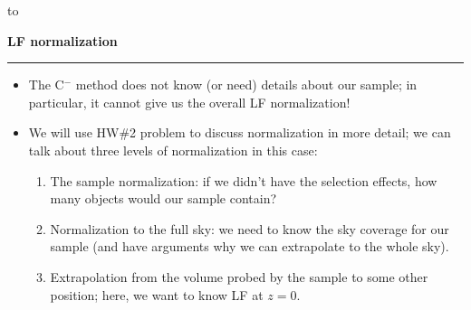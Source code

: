 \documentclass[letterpaper,landscape]{slides}
\begin{document}
\begin{slide}

\hbox to 
\vfill 
\end{slide}




\begin{slide}
\begin{center}
\bfseries
{\large {\color{red} LF normalization}}
\end{center}
\vskip 0.2in
\hrule

\begin{itemize}
\item The C$^-$ method does not know (or need) details about our sample; in particular, 
     it cannot give us the overall LF normalization! 
\item We will use HW\#2 problem to discuss normalization in more detail; we can talk 
about three levels of normalization in this case:
\begin{enumerate} 
\item {\color{blue} The sample normalization:} if we didn't have the selection effects, how many 
  objects would our sample contain? 
\item {\color{blue} Normalization to the full sky:} we need to know the sky coverage for our 
   sample (and have arguments why we can extrapolate to the whole sky). 
\item {\color{blue} Extrapolation}  from the volume probed by the sample  {\color{blue} to some other position;} 
   here, we want to know LF at $z=0$. 
\end{enumerate} 
\end{itemize}

\vfill
\end{slide}
 
\end{document}
